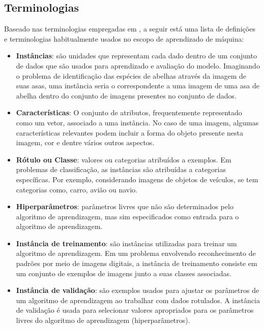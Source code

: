 \documentclass[
	12pt,				%
	oneside,			%
	a4paper,			%
	english,			%
	brazil				%
	]{abntex2ppgsi}
\begin{document}
\subsection{Terminologias}
Baseado nas terminologias empregadas em , a seguir está uma lista de definições e terminologias habitualmente usados no escopo de aprendizado de máquina:

\begin{itemize}
  \item \textbf{Instâncias}: são unidades que representam cada dado dentro de um conjunto de dados que são usados para aprendizado e avaliação do modelo. Imaginando o problema de identificação das espécies de abelhas através da imagem de suas asas, uma instância seria o correspondente a uma imagem de uma asa de abelha dentro do conjunto de imagens presentes no conjunto de dados.
  
  \item \textbf{Características}: O conjunto de atributos, frequentemente representado como um vetor, associado a uma instância. No caso de uma imagem, algumas características relevantes podem incluir a forma do objeto presente nesta imagem, cor e dentre vários outros aspectos.
  
  \item \textbf{Rótulo ou Classe}: valores ou categorias atribuídos a exemplos. Em problemas de classificação, as instâncias são atribuídas a categorias específicas. Por exemplo, considerando imagens de objetos de veículos, se tem categorias como, carro, avião ou navio.
  
  \item \textbf{Hiperparâmetros}: parâmetros livres que não são determinados pelo algoritmo de aprendizagem, mas sim especificados como entrada para o algoritmo de aprendizagem.

  \item \textbf{Instância de treinamento}: são instâncias utilizadas para treinar um algoritmo de aprendizagem. Em um problema envolvendo reconhecimento de padrões por meio de imagens digitais, a instância de treinamento consiste em um conjunto de exemplos de imagens junto a suas classes associadas.

  \item \textbf{Instância de validação}: são exemplos usados para ajustar os parâmetros de um algoritmo de aprendizagem ao trabalhar com dados rotulados. A instância de validação é usada para selecionar valores apropriados para os parâmetros livres do algoritmo de aprendizagem (hiperparâmetros).


\end{itemize}
\end{document}
